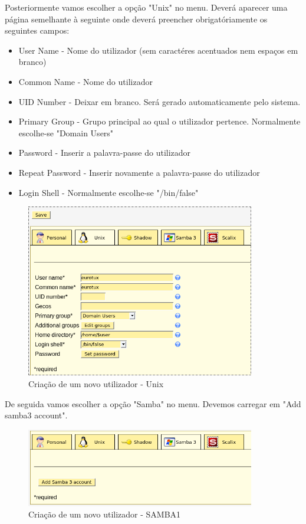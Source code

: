Posteriormente vamos escolher a opção "Unix" no menu. Deverá aparecer uma página semelhante à seguinte onde deverá preencher obrigatóriamente os seguintes campos:

\begin{itemize}
\item User Name - Nome do utilizador (sem caractéres acentuados nem espaços em branco)
\item Common Name - Nome do utilizador
\item UID Number - Deixar em branco. Será gerado automaticamente pelo sistema.
\item Primary Group - Grupo principal ao qual o utilizador pertence. Normalmente escolhe-se "Domain Users"
\item Password - Inserir a palavra-passe do utilizador
\item Repeat Password - Inserir novamente a palavra-passe do utilizador
\item Login Shell - Normalmente escolhe-se "/bin/false"
\end{itemize}

\begin{figure}[H]
    \begin{center}
        \includegraphics[width=10cm]{include/img/lam10}
    \end{center}
    \caption{Criação de um novo utilizador - Unix}
    \label{fig:LAM10}
\end{figure}

De seguida vamos escolher a opção "Samba" no menu. Devemos carregar em "Add samba3 account".

\begin{figure}[H]
    \begin{center}
        \includegraphics[width=10cm]{include/img/lam9}
    \end{center}
    \caption{Criação de um novo utilizador - SAMBA1}
    \label{fig:LAM9}
\end{figure}



